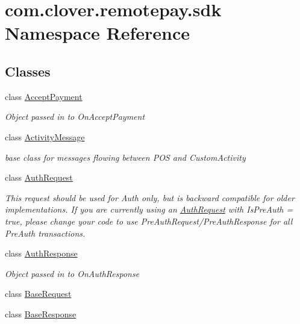\hypertarget{namespacecom_1_1clover_1_1remotepay_1_1sdk}{}\section{com.\+clover.\+remotepay.\+sdk Namespace Reference}
\label{namespacecom_1_1clover_1_1remotepay_1_1sdk}
\subsection*{Classes}
\begin{DoxyCompactItemize}
\item 
class \hyperlink{classcom_1_1clover_1_1remotepay_1_1sdk_1_1_accept_payment}{Accept\+Payment}
\begin{DoxyCompactList}\small\item\em Object passed in to On\+Accept\+Payment \end{DoxyCompactList}\item 
class \hyperlink{classcom_1_1clover_1_1remotepay_1_1sdk_1_1_activity_message}{Activity\+Message}
\begin{DoxyCompactList}\small\item\em base class for messages flowing between P\+OS and Custom\+Activity \end{DoxyCompactList}\item 
class \hyperlink{classcom_1_1clover_1_1remotepay_1_1sdk_1_1_auth_request}{Auth\+Request}
\begin{DoxyCompactList}\small\item\em This request should be used for Auth only, but is backward compatible for older implementations. If you are currently using an \hyperlink{classcom_1_1clover_1_1remotepay_1_1sdk_1_1_auth_request}{Auth\+Request} with Is\+Pre\+Auth = true, please change your code to use Pre\+Auth\+Request/\+Pre\+Auth\+Response for all Pre\+Auth transactions. \end{DoxyCompactList}\item 
class \hyperlink{classcom_1_1clover_1_1remotepay_1_1sdk_1_1_auth_response}{Auth\+Response}
\begin{DoxyCompactList}\small\item\em Object passed in to On\+Auth\+Response \end{DoxyCompactList}\item 
class \hyperlink{classcom_1_1clover_1_1remotepay_1_1sdk_1_1_base_request}{Base\+Request}
\item 
class \hyperlink{classcom_1_1clover_1_1remotepay_1_1sdk_1_1_base_response}{Base\+Response}

\end{DoxyCompactItemize}
